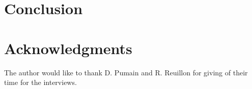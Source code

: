 \documentclass[runningheads,a4paper]{llncs2e/llncs}
\begin{document}
\section{Conclusion}




\section*{Acknowledgments}

The author would like to thank D. Pumain and R. Reuillon for giving of their time for the interviews.






\end{document}
